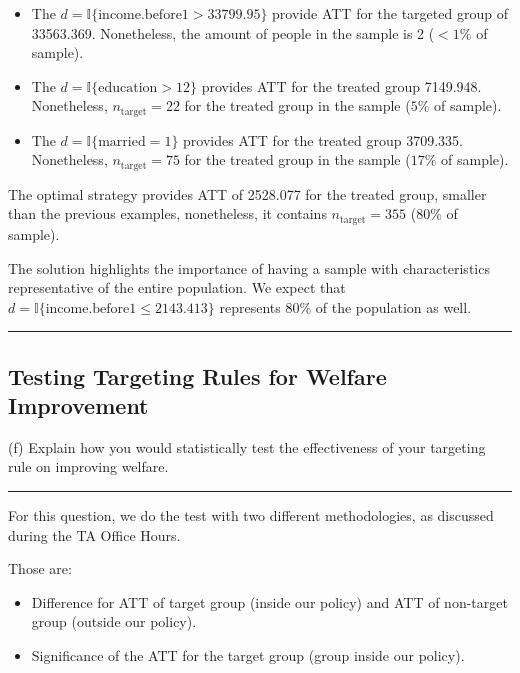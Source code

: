 \documentclass{article}
\newenvironment{colorparagraph}[1]{\par\color{#1}}{\par}
\begin{document}
\begin{itemize}
    \item The $d = \mathbb{I} \{ \text{income.before1} > 33799.95 \}$ provide ATT for the targeted group of 33563.369. Nonetheless, the amount of people in the sample is 2 ($< 1\%$ of sample).
    \item The $d = \mathbb{I} \{ \text{education} > 12 \}$ provides ATT for the treated group 7149.948. Nonetheless, $n_{\text{target}} = 22$ for the treated group in the sample ($5\%$ of sample).
    \item The $d = \mathbb{I} \{ \text{married} = 1 \}$ provides ATT for the treated group 3709.335. Nonetheless, $n_{\text{target}} = 75$ for the treated group in the sample ($17\%$ of sample).
\end{itemize}

The optimal strategy provides ATT of 2528.077 for the treated group, smaller than the previous examples, nonetheless, it contains $n_{\text{target}} = 355$ ($80\%$ of sample).

The solution highlights the importance of having a sample with characteristics representative of the entire population. We expect that $d = \mathbb{I} \{ \text{income.before1} \leq 2143.413 \}$ represents 80\% of the population as well.

\newpage

\begin{colorparagraph}{questioncolor}
\rule{\textwidth}{0.5pt}

\label{q4f}\subsection{Testing Targeting Rules for Welfare Improvement}
(f) Explain how you would statistically test the effectiveness of your targeting rule on improving welfare.

\rule{\textwidth}{0.5pt}
\end{colorparagraph}

For this question, we do the test with two different methodologies, as discussed during the TA Office Hours.

Those are:
\begin{itemize}
    \item Difference for ATT of target group (inside our policy) and ATT of non-target group (outside our policy).
    \item Significance of the ATT for the target group (group inside our policy).
\end{itemize}
\end{document}
